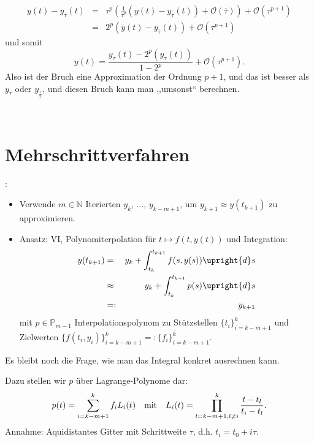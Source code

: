 \documentclass{book}
\newcommand{\backassign}{=:}
\newcommand{\textdots}{...}
\newcommand{\tmtextbf}[1]{\text{{\bfseries{#1}}}}
\newenvironment{itemizedot}{\begin{itemize} \renewcommand{\labelitemi}{$\bullet$}\renewcommand{\labelitemii}{$\bullet$}\renewcommand{\labelitemiii}{$\bullet$}\renewcommand{\labelitemiv}{$\bullet$}}{\end{itemize}}
\begin{document}
\begin{remark*}
\begin{itemizedot}
    
    \begin{eqnarray*}
      y (t) - y_{\tau} (t) & = & \tau^p \left( \frac{1}{\bar{\tau}^p} \left( y
      (t) - y_{\overline{\tau}} (t) \right) + \mathcal{O} \left(
      \overline{\tau} \right) \right) + \mathcal{O} (\tau^{p + 1})\\
      & = & 2^p \left( y (t) - y_{\overline{\tau}} (t) \right) + \mathcal{O}
      (\tau^{p + 1})
    \end{eqnarray*}
    und somit
    \[ y (t) = \frac{y_{\tau} (t) - 2^p \left( y_{\overline{\tau}} (t)
       \right)}{1 - 2^p} + \mathcal{O} (\tau^{p + 1}) . \]
    {\hspace{1.7em}}Also ist der Bruch eine Approximation der Ordnung $p + 1$,
    und das ist besser als $y_{\tau}$ oder $y_{\frac{\tau}{2}}$, und diesen
    Bruch kann man ,,umsonst`` berechnen.
  \end{itemizedot}
\end{remark*}

\

\section{Mehrschrittverfahren}

\tmtextbf{Motivation}:
\begin{itemizedot}
  \item Verwende $m \in \mathbb{N}$ Iterierten $y_k$, {\textdots}, $y_{k - m +
  1}$, um $y_{k + 1} \approx y (t_{k + 1})$ zu approximieren.
  
  \item Ansatz: VI, Polynomiterpolation f{\"u}r $t \mapsto f (t, y (t))$ und
  Integration:
  \begin{eqnarray*}
    y (t_{k + 1}) & = & y_k + \int_{t_k}^{t_{k + 1}} f (s, y (s)) \upright{d}
    s\\
    & \approx & y_k + \int_{t_k}^{t_{k + 1}} p (s) \upright{d} s\\
    & \backassign & y_{k + 1}
  \end{eqnarray*}
  mit $p \in \mathbb{P }_{m - 1}$ Interpolationspolynom zu St{\"u}tzstellen
  $\{ t_i \}_{i = k - m + 1}^k$ und Zielwerten $\{ f (t_i, y_i) \}_{i = k - m
  + 1}^k \backassign \{ f_i \}_{i = k - m + 1}^k$.
\end{itemizedot}
{\hspace{1.7em}}Es bleibt noch die Frage, wie man das Integral konkret
ausrechnen kann.

Dazu stellen wir $p$ {\"u}ber Lagrange-Polynome dar:
\[ p (t) = \sum_{i = k - m + 1}^k f_i L_i (t) \text{\quad mit\quad} L_i (t) =
   \prod_{l = k - m + 1, l \neq i}^k \frac{t - t_l}{t_i - t_l} . \]
{\hspace{1.7em}}Annahme: Aquidistantes Gitter mit Schrittweite $\tau$, d.h.
$t_i = t_0 + i \tau$.
\end{document}
